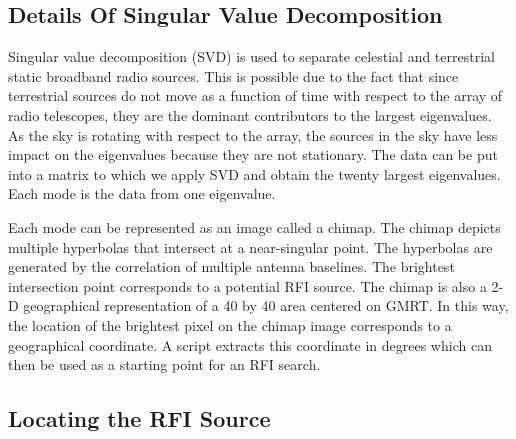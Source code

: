 \documentclass[a4paper,12pt]{article}
\begin{document}
\subsection{Details Of Singular Value Decomposition}
\label{sec:detailsofsingularvaluedecomposition}
\label{sec:thechimapmethod}
 
 Singular value decomposition (SVD) is used to separate celestial and terrestrial static broadband radio sources. This is possible due to the fact that since terrestrial sources do not move as a function of time with respect to the array of radio telescopes, they are the dominant contributors to the largest eigenvalues. As the sky is rotating with respect to the array, the sources in the sky have less impact on the eigenvalues because they are not stationary. The data can be put into a matrix to which we apply SVD and obtain the twenty largest eigenvalues. Each mode is the data from one eigenvalue. \citep{gmrtsearchforeor}
  
   
   Each mode can be represented as an image called a chimap. The chimap depicts multiple hyperbolas that intersect at a near-singular point. The hyperbolas are generated by the correlation of multiple antenna baselines. The brightest intersection point corresponds to a potential RFI source. The chimap is also a 2-D geographical representation of a \unit{40}{\kilo\metre} by \unit{40}{\kilo\metre} area centered on GMRT. In this way, the location of the brightest pixel on the chimap image corresponds to a geographical coordinate. A script extracts this coordinate in degrees which can then be used as a starting point for an RFI search.
    
     

      

      \subsection{Locating the RFI Source}
      \label{sec:locatingtherfisource}
\end{document}
